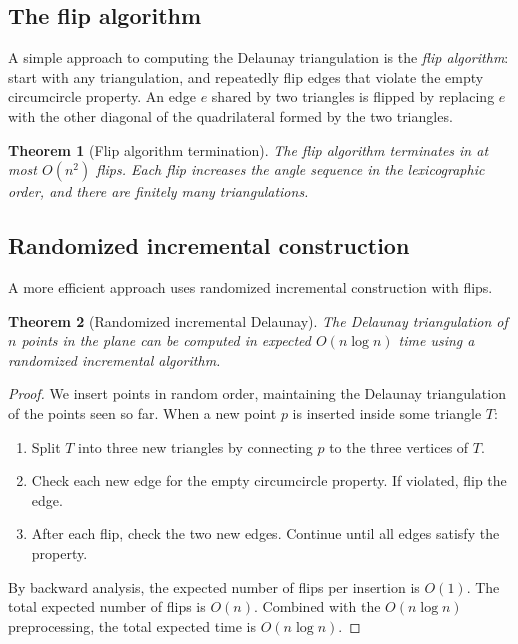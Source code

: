 \documentclass[twoside,12pt]{book}
\theoremstyle{plain}
\newtheorem{theorem}{Theorem}[chapter]
\theoremstyle{definition}
\theoremstyle{remark}
\begin{document}
\subsection{The flip algorithm}

A simple approach to computing the Delaunay triangulation is the \emph{flip algorithm}: start with any triangulation, and repeatedly flip edges that violate the empty circumcircle property. An edge $e$ shared by two triangles is flipped by replacing $e$ with the other diagonal of the quadrilateral formed by the two triangles.

\begin{theorem}[Flip algorithm termination]
The flip algorithm terminates in at most $O(n^2)$ flips. Each flip increases the angle sequence in the lexicographic order, and there are finitely many triangulations.
\end{theorem}

\subsection{Randomized incremental construction}

A more efficient approach uses randomized incremental construction with flips.

\begin{theorem}[Randomized incremental Delaunay]
\label{thm:delaunay-ric}
The Delaunay triangulation of $n$ points in the plane can be computed in expected $O(n \log n)$ time using a randomized incremental algorithm.
\end{theorem}

\begin{proof}
We insert points in random order, maintaining the Delaunay triangulation of the points seen so far. When a new point $p$ is inserted inside some triangle $T$:
\begin{enumerate}[nosep]
    \item Split $T$ into three new triangles by connecting $p$ to the three vertices of $T$.
    \item Check each new edge for the empty circumcircle property. If violated, flip the edge.
    \item After each flip, check the two new edges. Continue until all edges satisfy the property.
\end{enumerate}

By backward analysis, the expected number of flips per insertion is $O(1)$. The total expected number of flips is $O(n)$. Combined with the $O(n \log n)$ preprocessing, the total expected time is $O(n \log n)$.
\end{proof}
\end{document}
